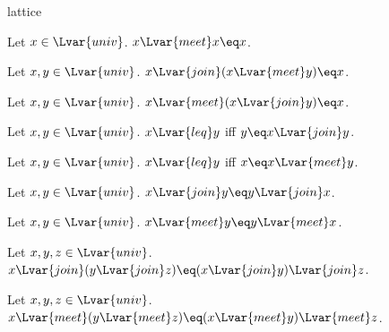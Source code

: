 \documentclass{stex}
\begin{document}
\begin{smodule}{lattice}
\begin{proposition*}[forthel,id=MeetIdempotenceThm,printid]
  Let $x\in\Lvar{univ}$.
  $x{\Lvar{meet}}x\eq x$.
\end{proposition*}

\begin{proposition*}[forthel,id=JoinAbsorbsMeetThm,printid]
  Let $x,y\in\Lvar{univ}$.
  $x{\Lvar{join}}(x{\Lvar{meet}}y)\eq x$.
\end{proposition*}

\begin{proposition*}[forthel,id=MeetAbsorbsJoinThm,printid]
  Let $x,y\in\Lvar{univ}$.
  $x{\Lvar{meet}}(x{\Lvar{join}}y)\eq x$.
\end{proposition*}

\begin{proposition*}[forthel,id=PrecedingIffJoinEqualsLargerOperandThm,printid]
  Let $x,y\in\Lvar{univ}$.
  $x{\Lvar{leq}}y$ iff $y\eq x{\Lvar{join}}y$.
\end{proposition*}

\begin{proposition*}[forthel,id=PrecedingIffMeetEqualsLargerOperandThm,printid]
  Let $x,y\in\Lvar{univ}$.
  $x{\Lvar{leq}}y$ iff $x\eq x{\Lvar{meet}}y$.
\end{proposition*}

\begin{proposition*}[forthel,id=JoinIsCommutativeThm,printid]
  Let $x,y\in\Lvar{univ}$.
  $x{\Lvar{join}}y\eq y{\Lvar{join}}x$.
\end{proposition*}

\begin{proposition*}[forthel,id=MeetIsCommutativeThm,printid]
  Let $x,y\in\Lvar{univ}$.
  $x{\Lvar{meet}}y\eq y{\Lvar{meet}}x$.
\end{proposition*}

\begin{proposition*}[forthel,id=JoinIsAssociativeThm,printid]
  Let $x,y,z\in\Lvar{univ}$.
  $x{\Lvar{join}}(y{\Lvar{join}}z)\eq (x{\Lvar{join}}y){\Lvar{join}}z$.
\end{proposition*}

\begin{proposition*}[forthel,id=MeetIsAssociativeThm,printid]
  Let $x,y,z\in\Lvar{univ}$.
  $x{\Lvar{meet}}(y{\Lvar{meet}}z)\eq (x{\Lvar{meet}}y){\Lvar{meet}}z$.
\end{proposition*}
\end{smodule}
\end{document}
